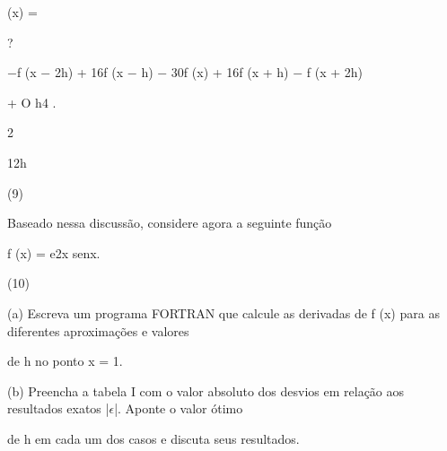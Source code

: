 \documentclass[a4paper,portrait,12pt]{article}
\begin{document}
\begin{flushleft}
(x) =
\end{flushleft}





?


\begin{flushleft}
$-$f (x $-$ 2h) + 16f (x $-$ h) $-$ 30f (x) + 16f (x + h) $-$ f (x + 2h)
\end{flushleft}


\begin{flushleft}
+ O h4 .
\end{flushleft}


2


\begin{flushleft}
12h
\end{flushleft}





(9)





\begin{flushleft}
Baseado nessa discuss\~{a}o, considere agora a seguinte fun\c{c}\~{a}o
\end{flushleft}


\begin{flushleft}
f (x) = e2x senx.
\end{flushleft}





(10)





\begin{flushleft}
(a) Escreva um programa FORTRAN que calcule as derivadas de f (x) para as diferentes aproxima\c{c}\~{o}es e valores
\end{flushleft}


\begin{flushleft}
de h no ponto x = 1.
\end{flushleft}


\begin{flushleft}
(b) Preencha a tabela I com o valor absoluto dos desvios em rela\c{c}\~{a}o aos resultados exatos |$\epsilon$|. Aponte o valor \'{o}timo
\end{flushleft}


\begin{flushleft}
de h em cada um dos casos e discuta seus resultados.
\end{flushleft}
\end{document}
